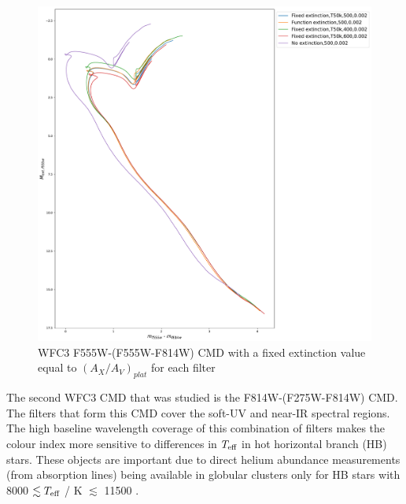 \documentclass[12pt, a4paper]{report}
\begin{document}
\begin{figure}[h]
\begin{center}
\includegraphics[width=1.0\textwidth]{../basti_isochrones_10_13Gyr/Extinction_T50k_FeH0fix_func_f555w_f555wmf814w_500_400_600_Myr_FeH_0p002_ref_noext_Av_1p0.pdf}
\caption{WFC3 F555W-(F555W-F814W) CMD with a fixed extinction value equal to $(A_{X}/A_{V})_{plat}$ for each filter}
\label{wfc3_isoc1_T50k}
\end{center}
\end{figure}

The second WFC3 CMD that was studied is the F814W-(F275W-F814W) CMD. The filters that form this CMD cover the soft-UV and near-IR spectral regions. The high baseline wavelength coverage of this combination of filters makes the colour index more sensitive to differences in $T_{\textnormal{eff}}$ in hot horizontal branch (HB) stars. These objects are important due to direct helium abundance measurements (from absorption lines) being available in globular clusters only for HB stars with 8000 $\lesssim T_{\textnormal{eff}}$ / K $\lesssim$ 11500 \citep{2018MNRAS.475.4088L}.
\end{document}
